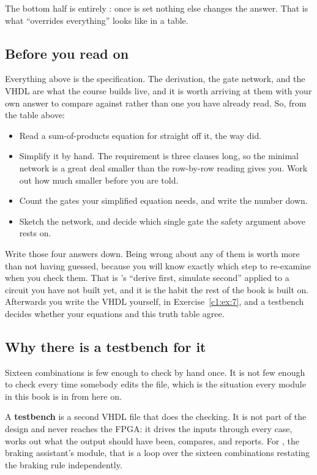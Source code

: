 \noindent The bottom half is entirely : once  is set nothing else changes
the answer. That is what ``overrides everything'' looks like in a table.

\subsection{Before you read on}
\label{c1:adasbefore}
Everything above is the specification. The derivation, the gate network, and the VHDL are what the
course builds live, and it is worth arriving at them with your own answer to compare against rather
than one you have already read. So, from the table above:
\begin{itemize}
  \item Read a sum-of-products equation for  straight off it, the way
     did.
  \item Simplify it by hand. The requirement is three clauses long, so the minimal network is a
    great deal smaller than the row-by-row reading gives you. Work out how much smaller before you
    are told.
  \item Count the gates your simplified equation needs, and write the number down.
  \item Sketch the network, and decide which single gate the safety argument above rests on.
\end{itemize}
Write those four answers down. Being wrong about any of them is worth more than not having guessed,
because you will know exactly which step to re-examine when you check them. That is
's ``derive first, simulate second'' applied to a circuit you have not built yet, and
it is the habit the rest of the book is built on. Afterwards you write the VHDL yourself, in
Exercise~\ref{c1:ex:7}, and a testbench decides whether your equations and this truth table
agree.

\subsection{Why there is a testbench for it}
\label{c1:adastb}
Sixteen combinations is few enough to check by hand once. It is not few enough to check every time
somebody edits the file, which is the situation every module in this book is in from here on.

A \textbf{testbench} is a second VHDL file that does the checking. It is not part of the design and
never reaches the FPGA: it drives the inputs through every case, works out what the output should
have been, compares, and reports. For , the braking assistant's module, that is a loop
over the sixteen combinations restating the braking rule independently.

